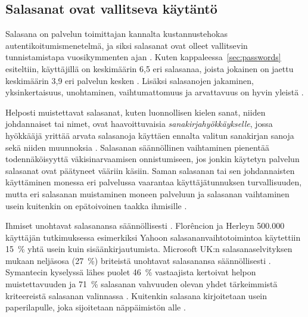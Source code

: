 \documentclass[english,gradu]{tktltiki}
\begin{document}
\subsection{Salasanat ovat vallitseva käytäntö}
\label{sec:passwords_de_facto}

             Salasana on palvelun toimittajan kannalta kustannustehokas autentikoitumismenetelmä, ja siksi salasanat ovat olleet vallitsevin tunnistamistapa vuosikymmenten ajan \cite{pw_auth_system_perspective_08}. Kuten kappaleessa~\ref{sec:passwords} esiteltiin, käyttäjillä on keskimäärin 6,5 eri salasanaa, joista jokainen on jaettu keskimäärin 3,9 eri palvelun kesken \cite{study_of_passwords_07}. Lisäksi salasanojen jakaminen, yksinkertaisuus, unohtaminen, vaihtumattomuus ja arvattavuus on hyvin yleistä \cite{password_management_strategies_06, pw_auth_system_perspective_08, passpet_06}.

             Helposti muistettavat salasanat, kuten luonnollisen kielen sanat, niiden johdannaiset tai nimet, ovat haavoittuvaisia \emph{sanakirjahyökkäykselle}, jossa hyökkääjä yrittää arvata salasanoja käyttäen ennalta valitun sanakirjan sanoja sekä niiden muunnoksia \cite{users_are_not_the_enemy_99, passpet_06}. Salasanan säännöllinen vaihtaminen pienentää todennäköisyyttä väkisinarvaamisen onnistumiseen, jos jonkin käytetyn palvelun salasanat ovat päätyneet vääriin käsiin. Saman salasanan tai sen johdannaisten käyttäminen monessa eri palvelussa vaarantaa käyttäjätunnuksen turvallisuuden, mutta eri salasanan muistaminen moneen palveluun ja salasanan vaihtaminen usein kuitenkin on epätoivoinen taakka ihmisille \cite{password_management_strategies_06, passpet_06, pw_auth_system_perspective_08, users_are_not_the_enemy_99}.

             Ihmiset unohtavat salasanansa säännöllisesti \cite{ponemon_pw_survey_06, password_management_strategies_06}. Florêncion ja Herleyn 500.000 käyttäjän tutkimuksessa \cite{study_of_passwords_07} esimerkiksi Yahoon salasananvaihtotoimintoa käytettiin 15~\% yhtä usein kuin sisäänkirjautumista. Microsoft UK:n salasanaselvityksen mukaan neljäsosa (27~\%) briteistä unohtavat salasanansa säännöllisesti \cite{microsoft_pw_survey_04}. Symantecin kyselyssä lähes puolet 46~\% vastaajista kertoivat helpon muistettavuuden ja 71~\% salasanan vahvuuden olevan yhdet tärkeimmistä kriteereistä salasanan valinnassa \cite{symantec_pw_survey_10}. Kuitenkin salasana kirjoitetaan usein paperilapulle, joka sijoitetaan näppäimistön alle \cite{pw_auth_system_perspective_08}.
\end{document}
